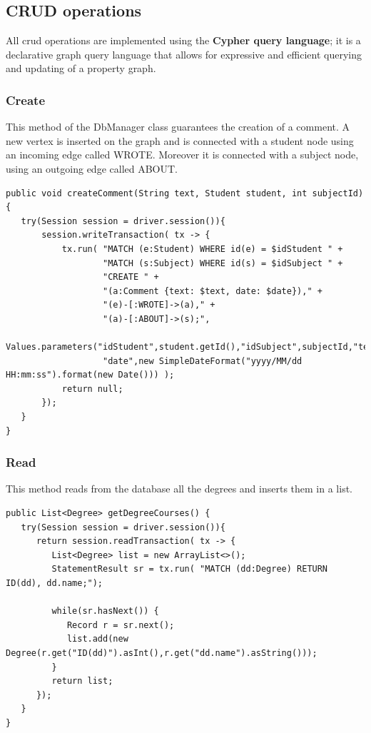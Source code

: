 \documentclass[a4paper]{article}
\begin{document}
\subsection{CRUD operations}
All crud operations are implemented using the \textbf{Cypher query language}; it is a declarative graph query language that allows for expressive and efficient querying and updating of a property graph.


\subsubsection{Create}
This method of the DbManager class guarantees the creation of a comment. A new vertex is inserted on the graph and  is connected with a student node using an incoming edge called WROTE. Moreover it is connected with a subject node, using an outgoing edge called ABOUT.

\begin{verbatim}
public void createComment(String text, Student student, int subjectId) {
   try(Session session = driver.session()){
       session.writeTransaction( tx -> {
           tx.run( "MATCH (e:Student) WHERE id(e) = $idStudent " + 
                   "MATCH (s:Subject) WHERE id(s) = $idSubject " +
                   "CREATE " + 
                   "(a:Comment {text: $text, date: $date})," + 
                   "(e)-[:WROTE]->(a)," + 
                   "(a)-[:ABOUT]->(s);", 
             Values.parameters("idStudent",student.getId(),"idSubject",subjectId,"text",text,
                   "date",new SimpleDateFormat("yyyy/MM/dd HH:mm:ss").format(new Date())) );
           return null;
       });
   }
}
\end{verbatim}


\subsubsection{Read}
This method reads from the database all the degrees and inserts them in a list.

\begin{verbatim}
public List<Degree> getDegreeCourses() {
   try(Session session = driver.session()){
      return session.readTransaction( tx -> {
         List<Degree> list = new ArrayList<>();
         StatementResult sr = tx.run( "MATCH (dd:Degree) RETURN ID(dd), dd.name;");
			
         while(sr.hasNext()) {
            Record r = sr.next();
            list.add(new Degree(r.get("ID(dd)").asInt(),r.get("dd.name").asString()));
         }
         return list;
      });
   }
}
\end{verbatim}
\end{document}
